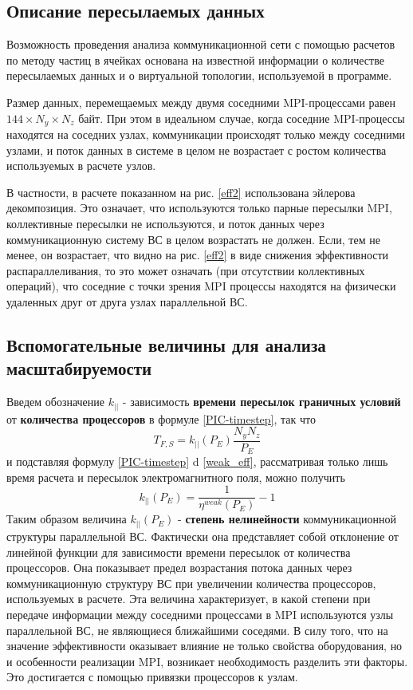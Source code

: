 		\subsection{Описание пересылаемых данных}
		
		Возможность проведения анализа коммуникационной сети с помощью расчетов по методу частиц в ячейках основана на известной информации о количестве пересылаемых данных и о виртуальной топологии, используемой в программе.
		
		Размер данных, перемещаемых между двумя соседними MPI-процессами равен $144 \times N_y \times N_z  $ байт. При этом в идеальном случае, когда соседние MPI-процессы находятся на соседних узлах, коммуникации происходят только между соседними узлами, и поток данных в системе в целом не возрастает с ростом количества используемых в расчете узлов.
		
		В частности, в расчете показанном на рис. \ref{eff2} использована эйлерова декомпозиция. Это означает, что используются только парные пересылки MPI, коллективные пересылки не используются, и поток данных через коммуникационную систему ВС в целом возрастать не должен. Если, тем не менее, он возрастает, что видно на рис. \ref{eff2} в виде снижения эффективности распараллеливания, то это может  означать (при отсутствии коллективных операций), что соседние с точки зрения MPI процессы находятся на физически удаленных друг от друга узлах параллельной ВС.
		
			\subsection{Вспомогательные величины для анализа масштабируемости}
		
		Введем обозначение $k_{||}$ - зависимость\textbf{ времени пересылок граничных условий} от \textbf{количества процессоров} в формуле \ref{PIC-timestep}, так что 
		\begin{equation}
		T_{F,S} = k_{||} (P_E) \frac{N_y N_z}{P_E}
		\end{equation} 
		и подставляя формулу \ref{PIC-timestep} d \ref{weak_eff}, рассматривая только лишь время расчета и пересылок электромагнитного поля, можно получить 
		\begin{equation}
		k_{||} (P_E) = \frac{1}{\eta^{weak}(P_E)} - 1
		\end{equation}	  
		Таким образом величина $k_{||} (P_E)$  - \textbf{степень нелинейности} коммуникационной структуры параллельной ВС. Фактически она представляет собой отклонение от линейной функции для зависимости времени пересылок от количества процессоров. Она показывает предел возрастания потока данных через коммуникационную структуру ВС при увеличении количества процессоров, используемых в расчете. Эта величина характеризует, в какой степени при передаче информации между соседними процессами в MPI используются узлы параллельной ВС, не являющиеся ближайшими соседями. В силу того, что на значение эффективности оказывает влияние не только свойства оборудования, но и особенности реализации MPI, возникает необходимость разделить эти факторы. Это достигается с помощью привязки процессоров к узлам. 
		
